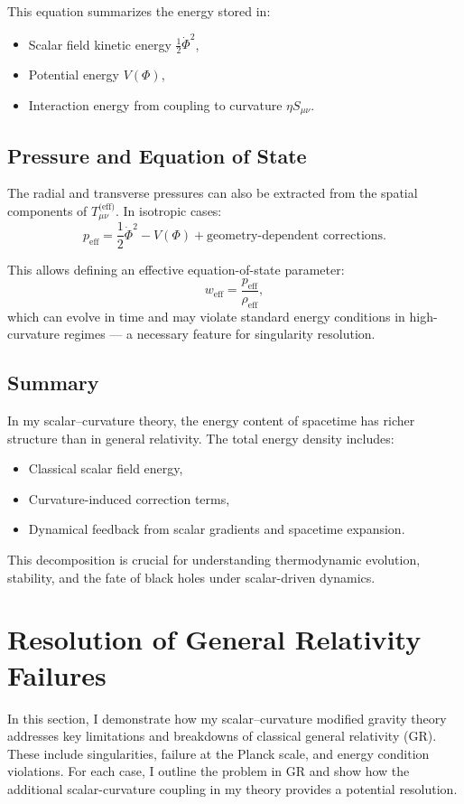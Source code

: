 \documentclass[12pt]{article}
\begin{document}
This equation summarizes the energy stored in:
\begin{itemize}
    \item Scalar field kinetic energy \( \frac{1}{2} \dot{\Phi}^2 \),
    \item Potential energy \( V(\Phi) \),
    \item Interaction energy from coupling to curvature \( \eta S_{\mu\nu} \).
\end{itemize}

\subsection{Pressure and Equation of State}

The radial and transverse pressures can also be extracted from the spatial components of \( T^{\text{(eff)}}_{\mu\nu} \). In isotropic cases:
\[
p_{\text{eff}} = \frac{1}{2} \dot{\Phi}^2 - V(\Phi) + \text{geometry-dependent corrections}.
\]

This allows defining an effective equation-of-state parameter:
\[
w_{\text{eff}} = \frac{p_{\text{eff}}}{\rho_{\text{eff}}},
\]
which can evolve in time and may violate standard energy conditions in high-curvature regimes — a necessary feature for singularity resolution.

\subsection{Summary}

In my scalar–curvature theory, the energy content of spacetime has richer structure than in general relativity. The total energy density includes:
\begin{itemize}
    \item Classical scalar field energy,
    \item Curvature-induced correction terms,
    \item Dynamical feedback from scalar gradients and spacetime expansion.
\end{itemize}

This decomposition is crucial for understanding thermodynamic evolution, stability, and the fate of black holes under scalar-driven dynamics.

\section{Resolution of General Relativity Failures}

In this section, I demonstrate how my scalar--curvature modified gravity theory addresses key limitations and breakdowns of classical general relativity (GR). These include singularities, failure at the Planck scale, and energy condition violations. For each case, I outline the problem in GR and show how the additional scalar-curvature coupling in my theory provides a potential resolution.
\end{document}
